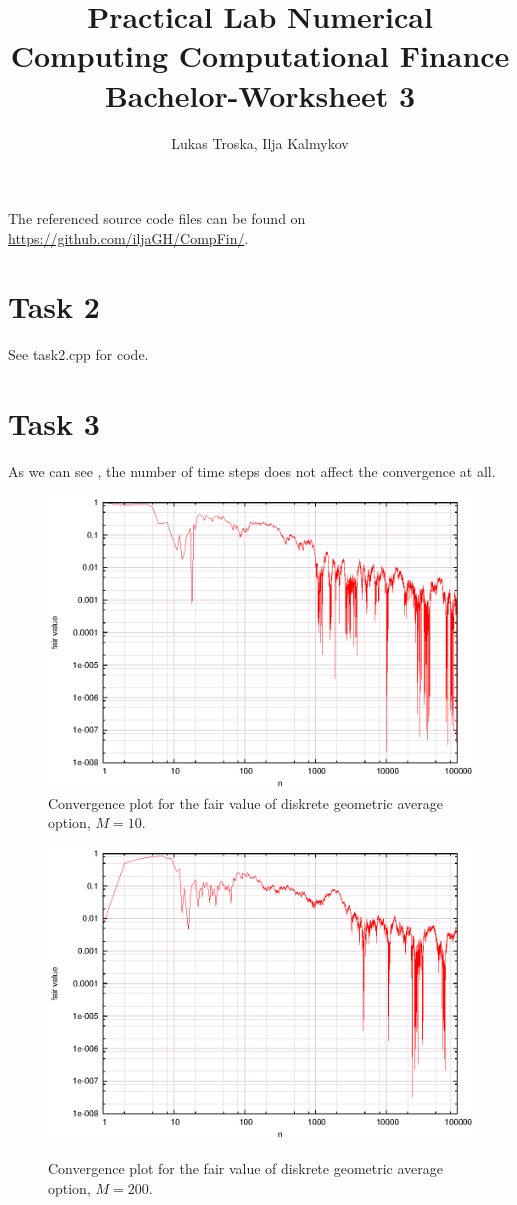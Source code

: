\documentclass[]{article}
\title{Practical Lab Numerical Computing Computational Finance \\Bachelor-Worksheet 3}
\author{Lukas Troska, Ilja Kalmykov}
\date{}
\begin{document}
\maketitle

The referenced source code files can be found on
\url{https://github.com/iljaGH/CompFin/}.

\section*{Task 2}
See task2.cpp for code.

\section*{Task 3}
As we can see , the number of time steps does not
affect the convergence at all.
\begin{figure}[!ht]
\includegraphics[width=.9\textwidth]{task3_10.eps}
\caption{Convergence plot for the fair value of diskrete geometric average
option, $M = 10$.}
\label{fig:Task3a}
\end{figure}
\begin{figure}[!ht]
\includegraphics[width=.9\textwidth]{task3_200.eps}\\
\caption{Convergence plot for the fair value of diskrete geometric average
option, $M = 200$.}
\label{fig:Task3b}
\end{figure}
\clearpage
\end{document}
